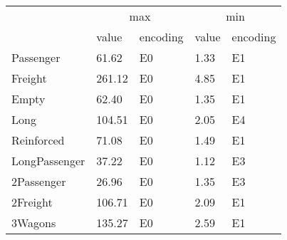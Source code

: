 \begin{tabular}{lllll}
\toprule
 & \multicolumn{2}{c}{max} & \multicolumn{2}{c}{min} \\
 & value & encoding & value & encoding \\
\midrule
Passenger & 61.62 & E0 & 1.33 & E1 \\
Freight & 261.12 & E0 & 4.85 & E1 \\
Empty & 62.40 & E0 & 1.35 & E1 \\
Long & 104.51 & E0 & 2.05 & E4 \\
Reinforced & 71.08 & E0 & 1.49 & E1 \\
LongPassenger & 37.22 & E0 & 1.12 & E3 \\
2Passenger & 26.96 & E0 & 1.35 & E3 \\
2Freight & 106.71 & E0 & 2.09 & E1 \\
3Wagons & 135.27 & E0 & 2.59 & E1 \\
\bottomrule
\end{tabular}
